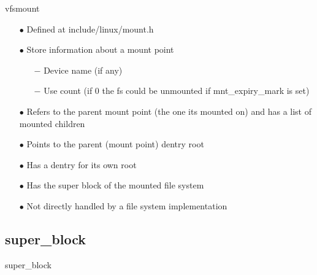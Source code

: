 \documentclass{beamer}
\begin{document}
\begin{frame}{vfsmount}
	
	\begin{itemize}[<+->]

		\item[$\bullet$]{Defined at include/linux/mount.h}	

		\item[$\bullet$]{Store information about a mount point}
			\begin{itemize}
				\item[$-$]{Device name (if any)}
				\item[$-$]{Use count (if 0 the fs could be unmounted if mnt\_expiry\_mark is set) }
			\end{itemize}	
		
		\item[$\bullet$]{Refers to the parent mount point (the one its mounted on) and has a list of mounted children}
		\item[$\bullet$]{Points to the parent (mount point) dentry root}
		\item[$\bullet$]{Has a dentry for its own root}
		\item[$\bullet$]{Has the super block of the mounted file system}		
		\item[$\bullet$]{Not directly handled by a file system implementation}
		
	\end{itemize}

\end{frame}

\subsection{super\_block}

\begin{frame}{super\_block}
	
	
\end{frame}
\end{document}
